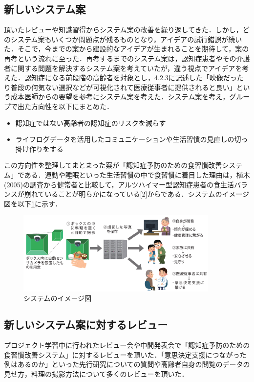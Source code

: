 \documentclass[../report]{subfiles}
\begin{document}
\subsection{新しいシステム案}
頂いたレビューや知識習得からシステム案の改善を繰り返してきた．しかし，どのシステム案もいくつか問題点が残るものとなり，アイデアの試行錯誤が続いた．そこで，今までの案から建設的なアイデアが生まれることを期待して，案の再考という流れに至った．再考するまでのシステム案は，認知症患者やその介護者に関する問題を解決するシステム案を考えていたが，違う視点でアイデアを考えた．認知症になる前段階の高齢者を対象とし，4.2.3に記述した「映像だったり普段の何気ない選択などが可視化されて医療従事者に提供されると良い」という成本医師からの要望を参考にシステム案を考えた．システム案を考え，グループで出た方向性を以下にまとめた．
\begin{itemize}
    \item 認知症ではない高齢者の認知症のリスクを減らす
    \item ライフログデータを活用したコミュニケーションや生活習慣の見直しの切っ掛け作りをする
\end{itemize}
この方向性を整理してまとまった案が「認知症予防のための食習慣改善システム」である．運動や睡眠といった生活習慣の中で食習慣に着目した理由は，植木(2005)の調査から健常者と比較して，アルツハイマー型認知症患者の食生活バランスが崩れていることが明らかになっている[2]からである．システムのイメージ図を以下\ref{fig:sys-image}に示す．
\begin{figure}[htbp]
    \begin{center}
        \includegraphics[width=10cm]{imgs/system-overview.png}
        \caption{システムのイメージ図}
        \label{fig:sys-image}
    \end{center}
\end{figure}

\subsection{新しいシステム案に対するレビュー}
プロジェクト学習中に行われたレビュー会や中間発表会で「認知症予防のための食習慣改善システム」に対するレビューを頂いた．「意思決定支援につながった例はあるのか」といった先行研究についての質問や高齢者自身の閲覧のデータの見せ方，料理の撮影方法について多くのレビューを頂いた．
\end{document}
